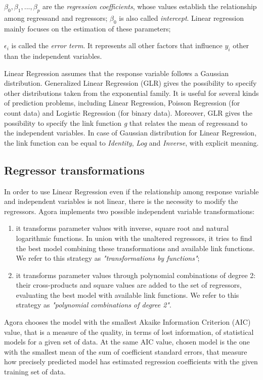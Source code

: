 $\beta_0, \beta_1, ..., \beta_p$ are the \textit{regression coefficients}, whose values establish the relationship among regressand and regressors; $\beta_0$ is also called \textit{intercept}. Linear regression mainly focuses on the estimation of these parameters;

$\epsilon_i$ is called the \textit{error term}. It represents all other factors that influence $y_i$ other than the independent variables.

Linear Regression assumes that the response variable follows a Gaussian distribution. Generalized Linear Regression (GLR) gives the possibility to specify other distributions taken from the exponential family. It is useful for several kinds of prediction problems, including Linear Regression, Poisson Regression (for count data) and Logistic Regression (for binary data). Moreover, GLR gives the possibility to specify the link function \textit{g} that relates the mean of regressand to the independent variables. In case of Gaussian distribution for Linear Regression, the link function can be equal to \textit{Identity}, \textit{Log} and \textit{Inverse}, with explicit meaning.


\subsection{Regressor transformations}\label{regrTransforms}

In order to use Linear Regression even if the relationship among response variable and independent variables is not linear, there is the necessity to modify the regressors. Agora implements two possible independent variable transformations:

\begin{enumerate}

    \item it transforms parameter values with inverse, square root and natural logarithmic functions. In union with the unaltered regressors, it tries to find the best model combining these transformations and available link functions. We refer to this strategy as \textit{"transformations by functions"};
    
    \item it transforms parameter values through polynomial combinations of degree 2: their cross-products and square values are added to the set of regressors, evaluating the best model with available link functions. We refer to this strategy as \textit{"polynomial combinations of degree 2"}.

\end{enumerate}

Agora chooses the model with the smallest Akaike Information Criterion (AIC) value, that is a measure of the quality, in terms of lost information, of statistical models for a given set of data. At the same AIC value, chosen model is the one with the smallest mean of the sum of coefficient standard errors, that measure how precisely predicted model has estimated regression coefficients with the given training set of data.
